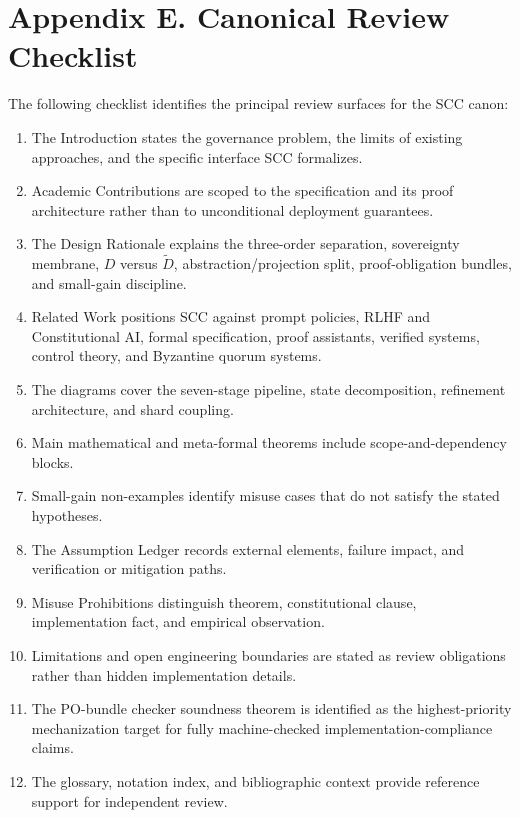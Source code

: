 \documentclass[10pt,oneside]{article}
\theoremstyle{definition}
\theoremstyle{remark}
\begin{document}
\section{Appendix E. Canonical Review Checklist}
The following checklist identifies the principal review surfaces for the SCC canon:
\begin{enumerate}
  \item The Introduction states the governance problem, the limits of existing approaches, and the specific interface SCC formalizes.
  \item Academic Contributions are scoped to the specification and its proof architecture rather than to unconditional deployment guarantees.
  \item The Design Rationale explains the three-order separation, sovereignty membrane, \(D\) versus \(\widetilde D\), abstraction/projection split, proof-obligation bundles, and small-gain discipline.
  \item Related Work positions SCC against prompt policies, RLHF and Constitutional AI, formal specification, proof assistants, verified systems, control theory, and Byzantine quorum systems.
  \item The diagrams cover the seven-stage pipeline, state decomposition, refinement architecture, and shard coupling.
  \item Main mathematical and meta-formal theorems include scope-and-dependency blocks.
  \item Small-gain non-examples identify misuse cases that do not satisfy the stated hypotheses.
  \item The Assumption Ledger records external elements, failure impact, and verification or mitigation paths.
  \item Misuse Prohibitions distinguish theorem, constitutional clause, implementation fact, and empirical observation.
  \item Limitations and open engineering boundaries are stated as review obligations rather than hidden implementation details.
  \item The PO-bundle checker soundness theorem is identified as the highest-priority mechanization target for fully machine-checked implementation-compliance claims.
  \item The glossary, notation index, and bibliographic context provide reference support for independent review.
\end{enumerate}
\end{document}
